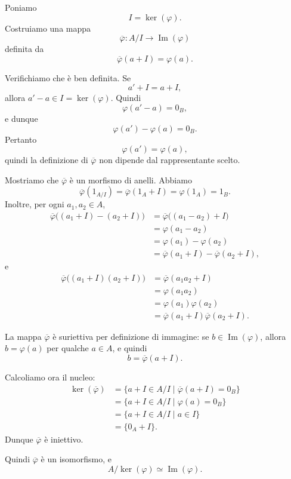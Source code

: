 \documentclass[a4paper]{article}
\begin{document}
\begin{radioactive}
\begin{snippetproof}{}
    Poniamo
    \[
        I=\ker(\varphi).
    \]
    Costruiamo una mappa
    \[
        \overline{\varphi}\colon A/I\to \operatorname{Im}(\varphi)
    \]
    definita da
    \[
        \overline{\varphi}(a+I)=\varphi(a).
    \]

    Verifichiamo che è ben definita. Se
    \[
        a'+I=a+I,
    \]
    allora \(a'-a\in I=\ker(\varphi)\). Quindi
    \[
        \varphi(a'-a)=0_B,
    \]
    e dunque
    \[
        \varphi(a')-\varphi(a)=0_B.
    \]
    Pertanto
    \[
        \varphi(a')=\varphi(a),
    \]
    quindi la definizione di \(\overline{\varphi}\) non dipende dal rappresentante scelto.

    Mostriamo che \(\overline{\varphi}\) è un morfismo di anelli. Abbiamo
    \[
        \overline{\varphi}(1_{A/I})
        =
        \overline{\varphi}(1_A+I)
        =
        \varphi(1_A)
        =
        1_B.
    \]
    Inoltre, per ogni \(a_1,a_2\in A\),
    \begin{align*}
        \overline{\varphi}\big((a_1+I)-(a_2+I)\big)
        &=
        \overline{\varphi}\big((a_1-a_2)+I\big) \\
        &=
        \varphi(a_1-a_2) \\
        &=
        \varphi(a_1)-\varphi(a_2) \\
        &=
        \overline{\varphi}(a_1+I)-\overline{\varphi}(a_2+I),
    \end{align*}
    e
    \begin{align*}
        \overline{\varphi}\big((a_1+I)(a_2+I)\big)
        &=
        \overline{\varphi}(a_1a_2+I) \\
        &=
        \varphi(a_1a_2) \\
        &=
        \varphi(a_1)\varphi(a_2) \\
        &=
        \overline{\varphi}(a_1+I)\overline{\varphi}(a_2+I).
    \end{align*}

    La mappa \(\overline{\varphi}\) è suriettiva per definizione di immagine: se \(b\in \operatorname{Im}(\varphi)\), allora \(b=\varphi(a)\) per qualche \(a\in A\), e quindi
    \[
        b=\overline{\varphi}(a+I).
    \]

    Calcoliamo ora il nucleo:
    \begin{align*}
        \ker(\overline{\varphi})
        &=
        \{a+I\in A/I\mid \overline{\varphi}(a+I)=0_B\} \\
        &=
        \{a+I\in A/I\mid \varphi(a)=0_B\} \\
        &=
        \{a+I\in A/I\mid a\in I\} \\
        &=
        \{0_A+I\}.
    \end{align*}
    Dunque \(\overline{\varphi}\) è iniettivo.

    Quindi \(\overline{\varphi}\) è un isomorfismo, e
    \[
        A/\ker(\varphi)\simeq \operatorname{Im}(\varphi).
    \]
\end{snippetproof}
\end{radioactive}
\end{document}
